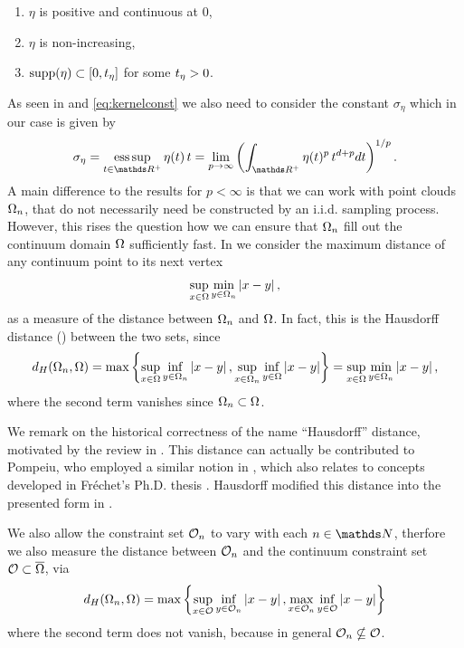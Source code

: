 \begin{enumerate}[label=(K\upshape\arabic*)]
\item\label{en:K1} $\eta$ is positive and continuous at $0$,
\item\label{en:K2} $\eta$ is non-increasing,
\item\label{en:K4} $\mathrm{supp}(\eta) \subset [0,t_\eta]$ for some $t_\eta>0$.
\end{enumerate}
%
As seen in \cite{GarcSlep15, slepcev2019analysis} and \cref{eq:kernelconst} we also need to consider the constant $\sigma_\eta$ which in our case is given by
%
\begin{align*}
\sigma_\eta = \esssup_{t\in \R^+} \eta(t)\, t =
\lim_{p\to\infty} \left(\int_{\R^+} \eta(t)^p\, t^{d+p} dt\right)^{1/p}.
\end{align*}
%
%
A main difference to the results for $p<\infty$ is that we can work with point clouds $\Omega_n$, that do not necessarily need be constructed by an i.i.d. sampling process. However, this rises the question how we can ensure that $\Omega_n$ fill out the continuum domain $\Omega$ sufficiently fast. In \cite{roith2022continuum} we consider the maximum distance of any continuum point to its next vertex
%
\begin{align}\label{eq:resolution}
\sup_{x\in\Omega} \min_{y\in\Omega_n} \left|x-y\right|,
\end{align}
%
as a measure of the distance between $\Omega_n$ and $\Omega$. In fact, this is the Hausdorff distance (\cite{hausdorff1914}) between the two sets, since 
%
\begin{align*}
d_H(\Omega_n, \Omega) = 
\max
\left\{
\sup_{x\in\Omega} \inf_{y\in\Omega_n} \left|x-y\right|,  
\sup_{x\in\Omega_n} \inf_{y\in\Omega} \left|x-y\right|
\right\} = 
\sup_{x\in\Omega} \min_{y\in\Omega_n} \left|x-y\right|,
\end{align*}
%
where the second term vanishes since $\Omega_n\subset\Omega$.
%
\begin{remark}{}{}
We remark on the historical correctness of the name \enquote{Hausdorff} distance, motivated by the review in \cite{birsan2006one}. This distance can actually be contributed to Pompeiu, who employed a similar notion in \cite{pompeiu1905continuite}, which also relates to concepts developed in Fréchet's Ph.D. thesis \cite{frechet1906quelques}. Hausdorff modified this distance into the presented form in \cite{hausdorff1914}.
\end{remark}
%
%
\noindent%
We also allow the constraint set $\mathcal{O}_n$ to vary with each $n\in\N$, therfore we also measure the distance between $\mathcal{O}_n$ and the continuum constraint set $\mathcal{O}\subset\overline{\Omega}$, via
%
\begin{align*}
d_H(\Omega_n, \Omega) = 
\max
\left\{
\sup_{x\in\mathcal{O}} \inf_{y\in\mathcal{O}_n} \left|x-y\right|,  
\max_{x\in\mathcal{O}_n} \inf_{y\in\mathcal{O}} \left|x-y\right|
\right\}
\end{align*}
%
where the second term does not vanish, because in general $\mathcal{O}_n\nsubseteq\mathcal{O}$.

